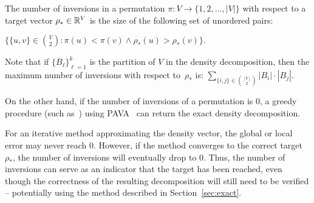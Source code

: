 \begin{definition}
\label{def:order1}
	The number of inversions 
	in a permutation 
	$\pi: V \rightarrow \{1, 2, \ldots, |V|\}$
	with respect to a target vector $\rho_* \in \mathbb{R}^V$
	is the size of the following set of unordered pairs:
	
	$\{ \{u, v \} \in {V \choose 2} : \pi(u) < \pi(v) \wedge \rho_*(u) > \rho_*(v)\}.$
\end{definition} 


Note that if $\{B_\ell\}_{\ell =1}^k$ is the partition of $V$ in the density
decomposition, then the maximum number 
of inversions with respect to~$\rho_*$ is: 
$\sum_{\{i,j\} \in {[k] \choose 2}} |B_i| \cdot |B_j|$.

On the other hand, if the number of inversions of a permutation
is 0, a greedy procedure (such as~\cite[Algorithm 3]{DBLP:conf/www/DanischCS17})
using PAVA~\cite{barlow1972statistical}
can return the exact density decomposition.


For an iterative method approximating the density vector, 
the global or local error may never reach 0. However, if the method converges to the correct target $\rho_*$, the number of inversions will eventually drop to 0. Thus, the number of inversions can serve as an indicator that the target has been reached, even though the correctness of the resulting decomposition will still need to be verified -- potentially using the method described 
in Section~\ref{sec:exact}.









